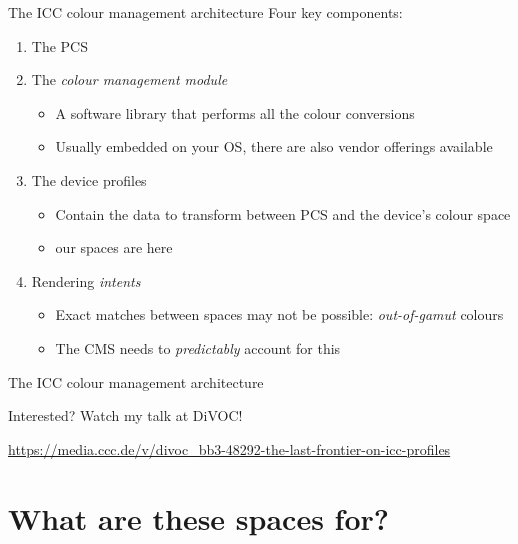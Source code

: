 \documentclass[aspectratio=169,handout,usepdftitle=false]{fireshonks}
\begin{document}
\begin{frame}{The ICC colour management architecture}
    Four key components:
    \begin{enumerate}[<+(1)->]
        \item The PCS
        \item The \emph{colour management module}
              \begin{itemize}
                  \item A software library that performs all the colour conversions
                  \item Usually embedded on your OS, there are also vendor offerings available
              \end{itemize}
        \item The device profiles
              \begin{itemize}
                  \item Contain the data to transform between PCS and the device's colour space
                  \item {} our spaces are here
              \end{itemize}
        \item Rendering \emph{intents}
              \begin{itemize}
                  \item Exact matches between spaces may not be possible: \emph{out-of-gamut} colours
                  \item The CMS needs to \emph{predictably} account for this
              \end{itemize}
    \end{enumerate}
\end{frame}
\begin{frame}{The ICC colour management architecture}
    \begin{center}
        Interested? Watch my talk at DiVOC!


        \url{https://media.ccc.de/v/divoc_bb3-48292-the-last-frontier-on-icc-profiles}
    \end{center}
\end{frame}
\section{What are these spaces for?}
\begin{frame}{}

    

\end{frame}
\end{document}
